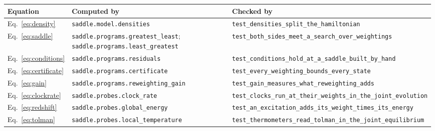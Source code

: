 \begin{tabular}{lp{2.55in}p{3.15in}}
\toprule
Equation & \raggedright Computed by & \raggedright Checked by \tabularnewline
\midrule
Eq.~\eqref{eq:density} & \raggedright \texttt{saddle.\allowbreak{}model.\allowbreak{}densities} & \raggedright \texttt{test\_\allowbreak{}densities\_\allowbreak{}split\_\allowbreak{}the\_\allowbreak{}hamiltonian} \tabularnewline
Eq.~\eqref{eq:saddle} & \raggedright \texttt{saddle.\allowbreak{}programs.\allowbreak{}greatest\_\allowbreak{}least}; \texttt{saddle.\allowbreak{}programs.\allowbreak{}least\_\allowbreak{}greatest} & \raggedright \texttt{test\_\allowbreak{}both\_\allowbreak{}sides\_\allowbreak{}meet\_\allowbreak{}a\_\allowbreak{}search\_\allowbreak{}over\_\allowbreak{}weightings} \tabularnewline
Eq.~\eqref{eq:conditions} & \raggedright \texttt{saddle.\allowbreak{}programs.\allowbreak{}residuals} & \raggedright \texttt{test\_\allowbreak{}conditions\_\allowbreak{}hold\_\allowbreak{}at\_\allowbreak{}a\_\allowbreak{}saddle\_\allowbreak{}built\_\allowbreak{}by\_\allowbreak{}hand} \tabularnewline
Eq.~\eqref{eq:certificate} & \raggedright \texttt{saddle.\allowbreak{}programs.\allowbreak{}certificate} & \raggedright \texttt{test\_\allowbreak{}every\_\allowbreak{}weighting\_\allowbreak{}bounds\_\allowbreak{}every\_\allowbreak{}state} \tabularnewline
Eq.~\eqref{eq:gain} & \raggedright \texttt{saddle.\allowbreak{}programs.\allowbreak{}reweighting\_\allowbreak{}gain} & \raggedright \texttt{test\_\allowbreak{}gain\_\allowbreak{}measures\_\allowbreak{}what\_\allowbreak{}reweighting\_\allowbreak{}adds} \tabularnewline
Eq.~\eqref{eq:clockrate} & \raggedright \texttt{saddle.\allowbreak{}probes.\allowbreak{}clock\_\allowbreak{}rate} & \raggedright \texttt{test\_\allowbreak{}clocks\_\allowbreak{}run\_\allowbreak{}at\_\allowbreak{}their\_\allowbreak{}weights\_\allowbreak{}in\_\allowbreak{}the\_\allowbreak{}joint\_\allowbreak{}evolution} \tabularnewline
Eq.~\eqref{eq:redshift} & \raggedright \texttt{saddle.\allowbreak{}probes.\allowbreak{}global\_\allowbreak{}energy} & \raggedright \texttt{test\_\allowbreak{}an\_\allowbreak{}excitation\_\allowbreak{}adds\_\allowbreak{}its\_\allowbreak{}weight\_\allowbreak{}times\_\allowbreak{}its\_\allowbreak{}energy} \tabularnewline
Eq.~\eqref{eq:tolman} & \raggedright \texttt{saddle.\allowbreak{}probes.\allowbreak{}local\_\allowbreak{}temperature} & \raggedright \texttt{test\_\allowbreak{}thermometers\_\allowbreak{}read\_\allowbreak{}tolman\_\allowbreak{}in\_\allowbreak{}the\_\allowbreak{}joint\_\allowbreak{}equilibrium} \tabularnewline

\end{tabular}

